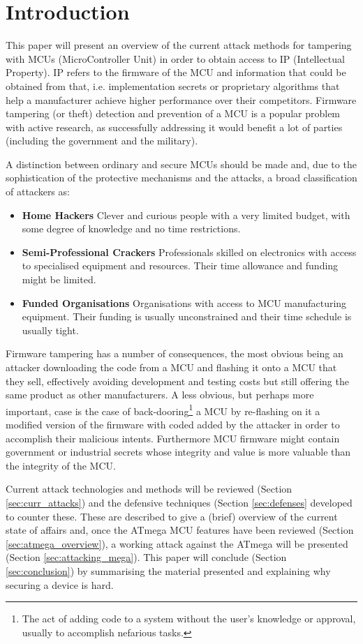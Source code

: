 \section{Introduction}
	This paper will present an overview of the current attack methods for tampering with MCUs (MicroController Unit) in order to obtain access to IP (Intellectual Property). IP refers to the firmware of the MCU and information that could be obtained from that, i.e. implementation secrets or proprietary algorithms that help a manufacturer achieve higher performance over their competitors. Firmware tampering (or theft) detection and prevention of a MCU is a popular problem with active research, as successfully addressing it would benefit a lot of parties (including the government and the military).
	
	A distinction between ordinary and secure MCUs should be made\citep{sergei:thesis} and, due to the sophistication of the protective mechanisms and the attacks, a broad classification of attackers as\cite{anderson:cautionary_note}:
		\begin{itemize}
			\item \textbf{Home Hackers} Clever and curious people with a very limited budget, with some degree of knowledge and no time restrictions.\\
			\item \textbf{Semi-Professional Crackers} Professionals skilled on electronics with access to specialised equipment and resources. Their time allowance and funding might be limited.\\
			\item \textbf{Funded Organisations} Organisations with access to MCU manufacturing equipment. Their funding is usually unconstrained and their time schedule is usually tight.
		\end{itemize}
	
	Firmware tampering has a number of consequences, the most obvious being an attacker downloading the code from a MCU and flashing it onto a MCU that they sell, effectively avoiding development and testing costs but still offering the same product as other manufacturers\cite{tech:aes_bls}. A less obvious, but perhaps more important, case is the case of back-dooring\footnote{The act of adding code to a system without the user's knowledge or approval, usually to accomplish nefarious tasks.} a MCU by re-flashing on it a modified version of the firmware with coded added by the attacker in order to accomplish their malicious intents. Furthermore MCU firmware might contain government or industrial secrets whose integrity and value is more valuable than the integrity of the MCU.
	
	Current attack technologies and methods will be reviewed (Section \ref{sec:curr_attacks}) and the defensive techniques (Section \ref{sec:defenses} developed to counter these. These are described to give a (brief) overview of the current state of affairs and, once the ATmega MCU features have been reviewed (Section \ref{sec:atmega_overview}), a working attack against the ATmega will be presented (Section \ref{sec:attacking_mega}). This paper will conclude (Section \ref{sec:conclusion}) by summarising the material presented and explaining why securing a device is hard. 
